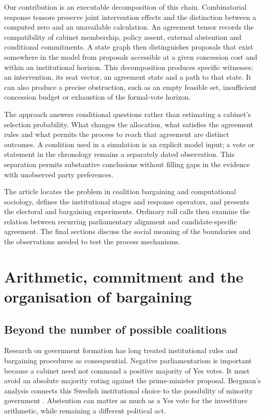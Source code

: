 \documentclass[11pt,a4paper]{article}
\begin{document}
Our contribution is an executable decomposition of this chain. Combinatorial response tensors preserve joint intervention effects and the distinction between a computed zero and an unavailable calculation. An agreement tensor records the compatibility of cabinet membership, policy assent, external abstention and conditional commitments. A state graph then distinguishes proposals that exist somewhere in the model from proposals accessible at a given concession cost and within an institutional horizon. This decomposition produces specific witnesses: an intervention, its seat vector, an agreement state and a path to that state. It can also produce a precise obstruction, such as an empty feasible set, insufficient concession budget or exhaustion of the formal-vote horizon.

The approach answers conditional questions rather than estimating a cabinet's selection probability. What changes the allocation, what satisfies the agreement rules and what permits the process to reach that agreement are distinct outcomes. A condition used in a simulation is an explicit model input; a vote or statement in the chronology remains a separately dated observation. This separation permits substantive conclusions without filling gaps in the evidence with unobserved party preferences.

The article locates the problem in coalition bargaining and computational sociology, defines the institutional stages and response operators, and presents the electoral and bargaining experiments. Ordinary roll calls then examine the relation between recurring parliamentary alignment and candidate-specific agreement. The final sections discuss the social meaning of the boundaries and the observations needed to test the process mechanisms.

\section{Arithmetic, commitment and the organisation of bargaining}

\subsection{Beyond the number of possible coalitions}

Research on government formation has long treated institutional rules and bargaining procedures as consequential. Negative parliamentarism is important because a cabinet need not command a positive majority of Yes votes. It must avoid an absolute majority voting against the prime-minister proposal. Bergman's analysis connects this Swedish institutional choice to the possibility of minority government \citep{bergman1993}. Abstention can matter as much as a Yes vote for the investiture arithmetic, while remaining a different political act.
\end{document}
